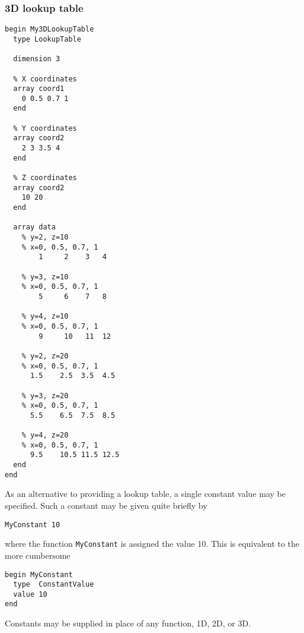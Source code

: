 \subsubsection{3D lookup table}

\begin{verbatim}
begin My3DLookupTable
  type LookupTable

  dimension 3

  % X coordinates
  array coord1
    0 0.5 0.7 1
  end

  % Y coordinates
  array coord2
    2 3 3.5 4
  end

  % Z coordinates
  array coord2
    10 20
  end
	
  array data
    % y=2, z=10
    % x=0, 0.5, 0.7, 1
        1	  2    3   4

    % y=3, z=10
    % x=0, 0.5, 0.7, 1
        5	  6    7   8

    % y=4, z=10
    % x=0, 0.5, 0.7, 1
        9	  10   11  12

    % y=2, z=20
    % x=0, 0.5, 0.7, 1
      1.5	 2.5  3.5  4.5

    % y=3, z=20
    % x=0, 0.5, 0.7, 1
      5.5	 6.5  7.5  8.5

    % y=4, z=20
    % x=0, 0.5, 0.7, 1
      9.5	 10.5 11.5 12.5
  end
end
\end{verbatim}



As an alternative to providing a lookup table, a single constant value
may be specified. Such a constant may be given quite briefly by
\begin{verbatim}
MyConstant 10
\end{verbatim}
where the function \texttt{MyConstant} is assigned the value 10. This
is equivalent to the more cumbersome
\begin{verbatim}
begin MyConstant
  type  ConstantValue
  value 10
end
\end{verbatim}

Constants may be supplied in place of any function, 1D, 2D, or 3D.

